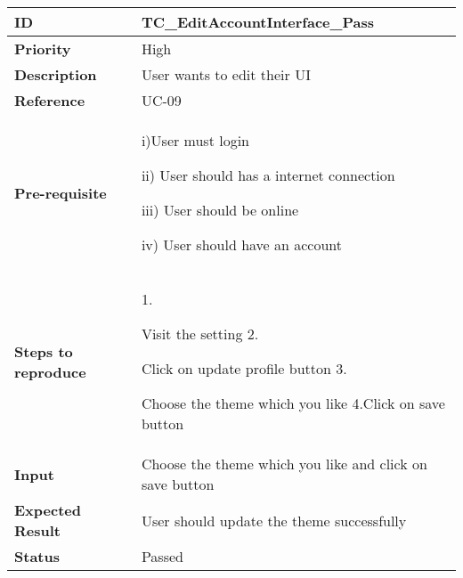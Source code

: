 \begin{center}
    \begin{tabularx}{\textwidth}{|l|X|}
        \hline
        \textbf{ID}                 & TC\_EditAccountInterface\_Pass                           \\
        \hline
        \textbf{Priority}           & High                                                     \\
        \hline
        \textbf{Description}        & User wants to edit their UI                              \\
        \hline
        \textbf{Reference}          & UC-09                                                    \\
        \hline
        \textbf{Pre-requisite}      & i)User must login

        ii) User should has a internet connection

        iii) User should be online

        iv) User should have an account                                                        \\
        \hline
        \textbf{Steps to reproduce} & 1.

        Visit the setting 2.

        Click on update profile button 3.

        Choose the theme which you like 4.Click on save button                                 \\
        \hline
        \textbf{Input}              & Choose the theme which you like and click on save button \\
        \hline
        \textbf{Expected Result}    & User should update the theme successfully                \\
        \hline
        \textbf{Status}             & Passed                                                   \\
        \hline
    \end{tabularx}
\end{center}
\vspace{5mm}



